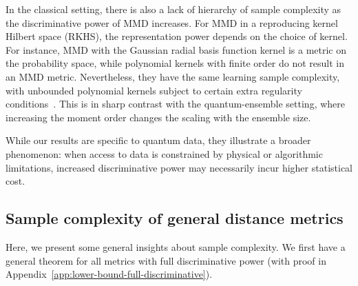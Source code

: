 \documentclass[aps,prx,reprint,superscriptaddress,amsmath,amssymb,longbibliography,floatfix]{revtex4-2}
\theoremstyle{plain}
\theoremstyle{definition}
\theoremstyle{remark}
\begin{document}
In the classical setting, there is also a lack of hierarchy of sample complexity as the discriminative power of MMD increases. For MMD in a reproducing kernel Hilbert space (RKHS), the representation power depends on the choice of kernel. For instance, MMD with the Gaussian radial basis function kernel is a metric on the probability space, while polynomial kernels with finite order do not result in an MMD metric. Nevertheless, they have the same learning sample complexity, with unbounded polynomial kernels subject to certain extra regularity conditions~\citep{MMD_JMLR:v13:gretton12a,TahmasebiJegelka2024ICML}. This is in sharp contrast with the quantum-ensemble setting, where increasing the moment order changes the scaling with the ensemble size.

While our results are specific to quantum data, they illustrate a broader phenomenon: when access to data is constrained by physical or algorithmic limitations, increased discriminative power may necessarily incur higher statistical cost.


\subsection{Sample complexity of general distance metrics}

Here, we present some general insights about sample complexity. We first have a general theorem for all metrics with full discriminative power (with proof in Appendix~\ref{app:lower-bound-full-discriminative}).
\end{document}
